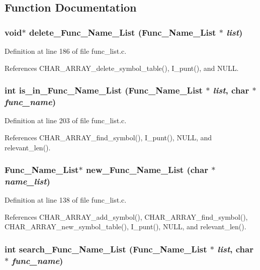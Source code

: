 \subsection{Function Documentation}
\subsubsection{\setlength{\rightskip}{0pt plus 5cm}void$\ast$ delete\_\-Func\_\-Name\_\-List (\bf{Func\_\-Name\_\-List} $\ast$ {\em list})}\label{func__list_8h_4dbeeb1df003cb357dad8a5ec5e9c21d}




Definition at line 186 of file func\_\-list.c.

References CHAR\_\-ARRAY\_\-delete\_\-symbol\_\-table(), I\_\-punt(), and NULL.
\subsubsection{\setlength{\rightskip}{0pt plus 5cm}int is\_\-in\_\-Func\_\-Name\_\-List (\bf{Func\_\-Name\_\-List} $\ast$ {\em list}, char $\ast$ {\em func\_\-name})}\label{func__list_8h_76984b7e4f8aaeb8441c6f4fb57f02fb}




Definition at line 203 of file func\_\-list.c.

References CHAR\_\-ARRAY\_\-find\_\-symbol(), I\_\-punt(), NULL, and relevant\_\-len().
\subsubsection{\setlength{\rightskip}{0pt plus 5cm}\bf{Func\_\-Name\_\-List}$\ast$ new\_\-Func\_\-Name\_\-List (char $\ast$ {\em name\_\-list})}\label{func__list_8h_34b5c5220cf09c263e3afec4a0441755}




Definition at line 138 of file func\_\-list.c.

References CHAR\_\-ARRAY\_\-add\_\-symbol(), CHAR\_\-ARRAY\_\-find\_\-symbol(), CHAR\_\-ARRAY\_\-new\_\-symbol\_\-table(), I\_\-punt(), NULL, and relevant\_\-len().
\subsubsection{\setlength{\rightskip}{0pt plus 5cm}int search\_\-Func\_\-Name\_\-List (\bf{Func\_\-Name\_\-List} $\ast$ {\em list}, char $\ast$ {\em func\_\-name})}\label{func__list_8h_b233af1e9a11e736d8fd079b02224138}


